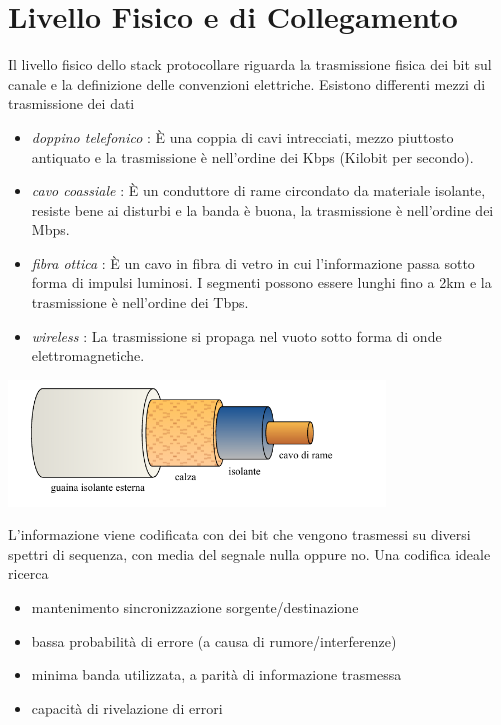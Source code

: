 \documentclass[10pt, letterpaper]{report}
\begin{document}
\section{Livello Fisico e di Collegamento}
Il livello fisico dello stack protocollare riguarda la trasmissione fisica dei bit sul canale e la definizione delle convenzioni elettriche. Esistono differenti mezzi di trasmissione dei dati\begin{itemize}
    \item \textit{doppino telefonico} : È una coppia di cavi intrecciati, mezzo piuttosto antiquato e la trasmissione è nell'ordine dei Kbps (Kilobit per secondo).
    \item \textit{cavo coassiale} : È un conduttore di rame circondato da materiale isolante, resiste bene ai disturbi e la banda è buona, la trasmissione è nell'ordine dei Mbps. 
    \item \textit{fibra ottica} : È un cavo in fibra di vetro in cui l'informazione passa sotto forma di impulsi luminosi. I segmenti possono essere lunghi fino a 2km e la trasmissione è nell'ordine dei Tbps.
    \item \textit{wireless} : La trasmissione si propaga nel vuoto sotto forma di onde elettromagnetiche.
\end{itemize}
\begin{center}
    \includegraphics[width=0.75\textwidth ]{images/cavoCoassiale.pdf}
\end{center}
L'informazione viene codificata con dei bit che vengono trasmessi su diversi spettri di sequenza, con media del segnale nulla oppure no. Una codifica ideale ricerca\begin{itemize}
    \item mantenimento sincronizzazione sorgente/destinazione
    \item bassa probabilità di errore (a causa di rumore/interferenze)
    \item minima banda utilizzata, a parità di informazione trasmessa
    \item capacità di rivelazione di errori
\end{itemize}
\end{document}
